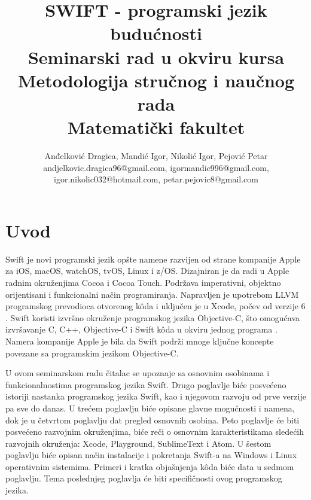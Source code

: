 \documentclass[a4paper]{article}
\begin{document}
\title{SWIFT - programski jezik budućnosti\\ \small{Seminarski rad u okviru kursa\\Metodologija stručnog i naučnog rada\\ Matematički fakultet}}

\author{Anđelković Dragica, Mandić Igor, Nikolić Igor, Pejović Petar\\ andjelkovic.dragica96@gmail.com,  igormandic996@gmail.com, \\ igor.nikolic032@hotmail.com, petar.pejovic8@gmail.com}


\maketitle



\tableofcontents

\newpage

\section{Uvod}
\label{sec:prviDeo}
Swift je novi programski jezik opšte namene razvijen od strane kompanije Apple za iOS, macOS, watchOS, tvOS, Linux i z/OS. Dizajniran je da radi u Apple radnim okruženjima Cocoa i Cocoa Touch. Podržava imperativni, objektno orijentisani i funkcionalni način programiranja. Napravljen je upotrebom LLVM programskog prevodioca otvorenog k\^{o}da i uključen je u Xcode, počev od verzije 6 \cite{swift_sajt}. Swift koristi izvršno okruženje programskog jezika Objective-C, što omogućava izvršavanje C, C++, Objective-C i Swift k\^{o}da u okviru jednog programa \cite{arc_sajt}.
Namera kompanije Apple je bila da Swift podrži mnoge ključne koncepte povezane sa programskim jezikom Objective-C.

U ovom seminarskom radu čitalac se upoznaje sa osnovnim osobinama i funkcionalnostima programskog jezika Swift. Drugo poglavlje biće posvećeno istoriji nastanka programskog jezika Swift, kao i njegovom razvoju od prve verzije pa sve do danas. U trećem poglavlju biće opisane glavne mogućnosti i namena, dok je u četvrtom poglavlju dat pregled osnovnih osobina. Peto poglavlje će biti posvećeno razvojnim okruženjima, biće reči o osnovnim karakteristikama sledećih razvojnih okruženja: Xcode, Playground, SublimeText i Atom. U šestom poglavlju biće opisan način instalacije i pokretanja Swift-a na Windows i Linux operativnim sistemima. Primeri i kratka objašnjenja k\^{o}da biće data u sedmom poglavlju. Tema poslednjeg poglavlja će biti specifičnosti ovog programskog jezika.
\end{document}
